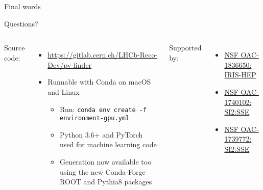 \begin{frame}{Final words}

\vspace{.5cm}
\begin{center}
    \textcolor{lhcbBlue}{ \huge Questions?}
\end{center}

\vspace{1cm}
\begin{columns}[t]
    Source code:
    \begin{itemize}
        \item \url{https://gitlab.cern.ch/LHCb-Reco-Dev/pv-finder}
        \item Runnable with Conda on macOS and Linux
        \begin{itemize}
            \item Run: \texttt{conda env create -f environment-gpu.yml}
            \item Python 3.6+ and PyTorch used for machine learning code
            \item Generation now available too using the new Conda-Forge ROOT and Pythia8 packages
        \end{itemize}
    \end{itemize}

	Supported by:
	\begin{itemize}
		\item \href{https://www.nsf.gov/awardsearch/showAward?AWD_ID=1836650}{NSF OAC-1836650: IRIS-HEP}
		\item \href{https://www.nsf.gov/awardsearch/showAward?AWD_ID=1740102}{NSF OAC-1740102: SI2:SSE}
		\item \href{https://www.nsf.gov/awardsearch/showAward?AWD_ID=1739772}{NSF OAC-1739772: SI2:SSE}
	\end{itemize}
\end{columns}


\end{frame}
